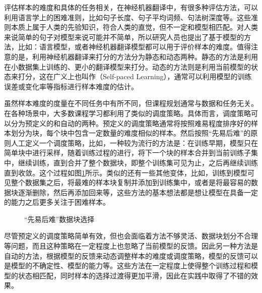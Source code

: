 \parinterval 评估样本的难度和具体的任务相关，在神经机器翻译中，有很多种评估方法，可以利用语言学上的困难准则，比如句子长度、句子平均词频、句法树深度等。这些准则本质上属于人类的先验知识，符合人类的直觉，但不一定和模型相匹配。对人类来说简单的句子对模型来说可能并不简单，所以研究人员也提出了基于模型的方法，比如：语言模型，或者神经机器翻译模型都可以用于评价样本的难度。值得注意的是，利用神经机器翻译来打分的方法分为静态和动态两种。静态的方法是利用在小数据集上训练的、更小的翻译模型来打分。动态的方法则是利用当前模型的状态来打分，这在广义上也叫作{\small{}}（Self-paced Learning），通常可以利用模型的训练误差或变化率等指标进行样本难度的估计。

\parinterval 虽然样本难度的度量在不同任务中有所不同，但课程规划通常与数据和任务无关。在各种场景中，大多数课程学习都利用了类似的调度策略。具体而言，调度策略可以分为预定义的和自动的两种。预定义的调度策略通常将按照难易程度排序好的样本划分为块，每个块中包含一定数量的难度相似的样本。然后按照“先易后难”的原则人工定义一个调度策略，比如，一种较为流行的方法是：在训练早期，模型只在简单块中进行采样，随着训练过程的进行，将下一个块的样本合并到当前训练子集中，继续训练，直到合并了整个数据块，即整个训练集可见为止，之后再继续训练直到收敛。这个过程如图\ref{fig:13-15}所示。类似的还有一些其他变体，比如，训练到模型可见整个数据集之后，将最难的样本块复制并添加到训练集中，或者是将最容易的数据块逐渐删除，然后再添加回来等，这些方法的基本想法都是想让模型在具备一定的能力之后更多关注于困难样本。

\begin{figure}[htp]
\centering

\caption{“先易后难”数据块选择}
\label{fig:13-15}
\end{figure}

\parinterval 尽管预定义的调度策略简单有效，但也会面临着方法不够灵活、数据块划分不合理等问题，而且这种策略在一定程度上也忽略了当前模型的反馈。因此另一种方法是自动的方法，根据模型的反馈来动态调整样本的难度或调度策略，模型的反馈可以是模型的不确定性、模型的能力等。这些方法在一定程度上使得整个训练过程和模型的状态相匹配，同时样本的选择过渡得更加平滑，因此在实践中取得了不错的效果。

